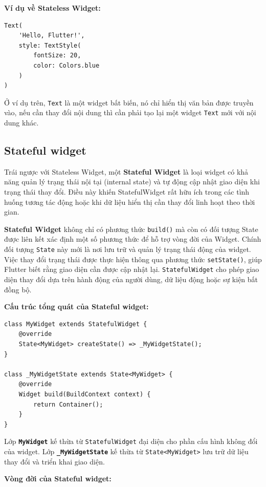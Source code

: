 \documentclass[../DoAn.tex]{subfiles}
\numberwithin{figure}{chapter}
\begin{document}
\textbf{Ví dụ về Stateless Widget:}
\begin{lstlisting}
Text(
    'Hello, Flutter!', 
    style: TextStyle(
        fontSize: 20, 
        color: Colors.blue
    )
)
\end{lstlisting}


Ở ví dụ trên, \texttt{Text} là một widget bất biến, nó chỉ hiển thị văn bản được truyền vào, nếu cần thay đổi nội dung thì cần phải tạo lại một widget \texttt{Text} mới với nội dung khác.

\subsection{Stateful widget}
Trái ngược với Stateless Widget, một \textbf{Stateful Widget} là loại widget có khả năng quản lý trạng thái nội tại (internal state) và tự động cập nhật giao diện khi trạng thái thay đổi. Điều này khiến StatefulWidget rất hữu ích trong các tình huống tương tác động hoặc khi dữ liệu hiển thị cần thay đổi linh hoạt theo thời gian.

\textbf{Stateful Widget} không chỉ có phương thức \texttt{build()} mà còn có đối tượng State được liên kết xác định một số phương thức để hỗ trợ vòng đời của Widget. Chính đối tượng \texttt{State} này mới là nơi lưu trữ và quản lý trạng thái động của widget. Việc thay đổi trạng thái được thực hiện thông qua phương thức \texttt{setState()}, giúp Flutter biết rằng giao diện cần được cập nhật lại.
\texttt{StatefulWidget} cho phép giao diện thay đổi dựa trên hành động của người dùng, dữ liệu động hoặc sự kiện bất đồng bộ.

\textbf{Cấu trúc tổng quát của Stateful widget:}

\begin{lstlisting}
class MyWidget extends StatefulWidget {
    @override
    State<MyWidget> createState() => _MyWidgetState();
}

class _MyWidgetState extends State<MyWidget> {
    @override
    Widget build(BuildContext context) {
        return Container(); 
    }
}
\end{lstlisting}

Lớp \textbf{\texttt{MyWidget}} kế thừa từ \texttt{StatefulWidget} đại diện cho phần cấu hình không đổi của widget. Lớp \textbf{\texttt{\_MyWidgetState}} kế thừa từ \texttt{State<MyWidget>} lưu trữ dữ liệu thay đổi và triển khai giao diện.

\textbf{Vòng đời của Stateful widget:}
\end{document}
